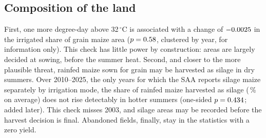 \subsection{Composition of the land}

First, one more degree-day above 32\,$^{\circ}$C is associated with a change of $-0.0025$ in the irrigated share of grain maize area ($p = 0.58$, clustered by year, for information only). This check has little power by construction: areas are largely decided at sowing, before the summer heat. Second, and closer to the more plausible threat, rainfed maize sown for grain may be harvested as silage in dry summers. Over 2010--2025, the only years for which the SAA reports silage maize separately by irrigation mode, the share of rainfed maize harvested as silage (\SilageShare\,\% on average) does not rise detectably in hotter summers (one-sided $p = 0.434$; added later). This check misses 2003, and silage areas may be recorded before the harvest decision is final. Abandoned fields, finally, stay in the statistics with a zero yield.
